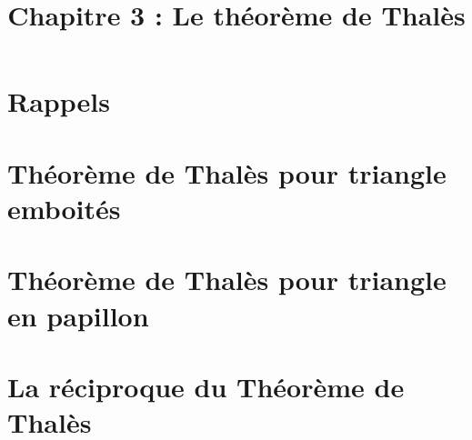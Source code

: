 \title{\vspace{-2em}Chapitre 3 : Le théorème de Thalès\vspace{-3em}}%
\date{ }
\maketitle


\section{Rappels}



\section{Théorème de Thalès pour triangle emboités}



\section{Théorème de Thalès pour triangle en papillon}



\section{La réciproque du Théorème de Thalès}

